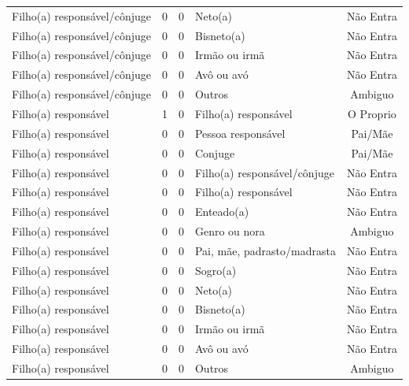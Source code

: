 \documentclass[
	12pt,				%
	openright,			%
	twoside,			%
	a4paper,			%
	english,			%
	french,				%
	spanish,			%
	brazil				%
	]{abntex2}
\begin{document}
\begin{anexosenv}
\begin{longtable}{@{}lcclc@{}}
Filho(a) responsável/cônjuge & 0         & 0        & Neto(a)                      & Não Entra       \\
Filho(a) responsável/cônjuge & 0         & 0        & Bisneto(a)                   & Não Entra       \\
Filho(a) responsável/cônjuge & 0         & 0        & Irmão ou irmã                & Não Entra       \\
Filho(a) responsável/cônjuge & 0         & 0        & Avô ou avó                   & Não Entra       \\
Filho(a) responsável/cônjuge & 0         & 0        & Outros                       & Ambiguo         \\
Filho(a) responsável         & 1         & 0        & Filho(a) responsável         & O Proprio       \\
Filho(a) responsável         & 0         & 0        & Pessoa responsável           & Pai/Mãe         \\
Filho(a) responsável         & 0         & 0        & Conjuge                      & Pai/Mãe         \\
Filho(a) responsável         & 0         & 0        & Filho(a) responsável/cônjuge & Não Entra       \\
Filho(a) responsável         & 0         & 0        & Filho(a) responsável         & Não Entra       \\
Filho(a) responsável         & 0         & 0        & Enteado(a)                   & Não Entra       \\
Filho(a) responsável         & 0         & 0        & Genro ou nora                & Ambiguo         \\
Filho(a) responsável         & 0         & 0        & Pai, mãe, padrasto/madrasta  & Não Entra       \\
Filho(a) responsável         & 0         & 0        & Sogro(a)                     & Não Entra       \\
Filho(a) responsável         & 0         & 0        & Neto(a)                      & Não Entra       \\
Filho(a) responsável         & 0         & 0        & Bisneto(a)                   & Não Entra       \\
Filho(a) responsável         & 0         & 0        & Irmão ou irmã                & Não Entra       \\
Filho(a) responsável         & 0         & 0        & Avô ou avó                   & Não Entra       \\
Filho(a) responsável         & 0         & 0        & Outros                       & Ambiguo         \\

\end{longtable}
\end{anexosenv}
\end{document}
